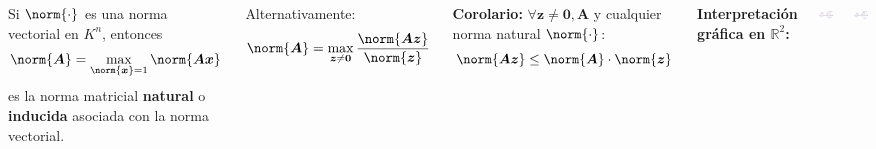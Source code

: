 \documentclass[9pt, aspectratio=169]{beamer}
\begin{document}
\begin{frame}
\begin{columns}[t]
\cx
\begin{theorem}
  Si $\norm{\cdot}$ es una norma vectorial en $K^n$, entonces
  \[ \norm{\bm{A}} = \max_{\norm{\bm{x}} = 1} \norm{\bm{A} \bm{x}} \]
es la norma matricial \textbf{natural} o \textbf{inducida} asociada con la norma vectorial.
\end{theorem}
Alternativamente: 
\[ \norm{\bm{A}} = \max_{\bm{z} \neq \bm{0}} \frac{ \norm{\bm{A} \bm{z}}}{\norm{\bm{z}}} \]

\textbf{Corolario:} $\forall \bm{z} \neq \bm{0}, \bm{A}$ y cualquier norma natural $\norm{\cdot}$:
\[ \norm{\bm{A} \bm{z}} \leq \norm{\bm{A}} \cdot \norm{\bm{z}} \]
\pause

\cx
\textbf{Interpretación gráfica en $\mathbb{R}^2$:}
\begin{center}
  \includegraphics[scale=0.6]{figs/nmat-01.pdf}
\end{center}
\begin{center}
  \includegraphics[scale=0.6]{figs/nmat-02.pdf}
\end{center}
\end{columns}
\end{frame}
\end{document}

